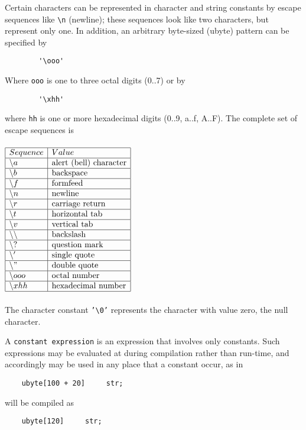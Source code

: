 Certain characters can be represented in character and string constants
by escape sequences like \texttt{\textbackslash n} (newline); these sequences look
like two characters, but represent only one. In addition, an arbitrary
byte-sized (ubyte) pattern can be specified by
\begin{lstlisting}
        '\ooo'
\end{lstlisting}
Where \texttt{ooo} is one to three octal digits (0..7) or by
\begin{lstlisting}
        '\xhh'
\end{lstlisting}
where \texttt{hh} is one or more hexadecimal digits (0..9, a..f, A..F).
The complete set of escape sequences is
\\\\
$\begin{array}{|l|l|}
\hline
Sequence & Value\\
\hline
\backslash a & \text{alert (bell) character} \\
\hline
\backslash b & \text{backspace} \\
\hline
\backslash f & \text{formfeed} \\
\hline
\backslash n & \text{newline} \\
\hline
\backslash r & \text{carriage return} \\
\hline
\backslash t & \text{horizontal tab} \\
\hline
\backslash v & \text{vertical tab} \\
\hline
\backslash \backslash & \text{backslash} \\
\hline
\backslash ? & \text{question mark} \\
\hline
\backslash ' & \text{single quote} \\
\hline
\backslash " & \text{double quote} \\
\hline
\backslash ooo & \text{octal number} \\
\hline
\backslash xhh & \text{hexadecimal number} \\
\hline
\end{array}$
\\\\
The character constant \texttt{'\textbackslash 0'} represents the character
with value zero, the null character.

A \texttt{constant expression} is an expression that involves only constants.
Such expressions may be evaluated at during compilation rather than run-time,
and accordingly may be used in any place that a constant occur, as in
\begin{lstlisting}
    ubyte[100 + 20]     str;
\end{lstlisting}
will be compiled as
\begin{lstlisting}
    ubyte[120]     str;
\end{lstlisting}

